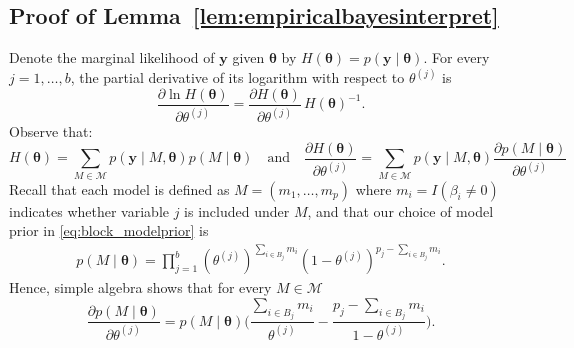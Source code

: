\documentclass[bj,authoryear]{imsart}
\theoremstyle{plain}
\newcommand{\M}{\mathcal{M}}
\newcommand{\bs}{\boldsymbol}
\begin{document}
\subsection{Proof of Lemma~\ref{lem:empiricalbayesinterpret}}

Denote the marginal likelihood of $\bs y$ given $\bs \theta$ by $H(\bs \theta)=p(\bs y \mid \bs \theta)$. For every $j=1,\ldots,b$, the partial derivative of its logarithm with respect to $\theta^{(j)}$ is
    \begin{equation}\label{eq:logderivative}
        \frac{\partial \ln H(\bs \theta)}{\partial \theta^{(j)}}=\frac{\partial H(\bs \theta)}{\partial \theta^{(j)}}\,H(\boldsymbol{\theta})^{-1}.
    \end{equation}
    Observe that:
    \begin{equation}\label{eq:partialmarglikelihood}
    H(\bs \theta)=\sum_{M \in \M}p(\bs y \mid M,\bs\theta)p(M \mid \bs \theta)
    \quad \text{and}\quad 
    \frac{\partial H(\bs \theta)}{\partial \theta^{(j)}}=\sum_{M\in \M}p(\bs y \mid M,\bs\theta)\frac{\partial p(M \mid \bs \theta)}{\partial \theta^{(j)}}
    \end{equation}
    Recall that each model is defined as $M=(m_1,\ldots,m_p)$ where $m_i = I(\beta_i \neq 0)$ indicates whether variable $j$ is included under $M$, and that our choice of model prior in \eqref{eq:block_modelprior} is 
    \begin{align}
        p( M \mid \boldsymbol{\theta})=
        \prod_{j=1}^b (\theta^{(j)})^{\sum_{i \in B_j} m_i}
        (1 - \theta^{(j)})^{p_j - \sum_{i \in B_j} m_i}.
        \nonumber
    \end{align}
    Hence, simple algebra shows that for every $M\in \mathcal M$
    \begin{equation}\label{eq:partialprobmodel}
    \frac{\partial p(M \mid \bs \theta)}{\partial \theta^{(j)}}= p(M \mid \bs \theta) \bigg(\frac{\sum_{i\in B_j}m_i}{\theta^{(j)}}-\frac{p_j-\sum_{i\in B_j}m_i}{1-\theta^{(j)}} \bigg).       
    \end{equation}
    
\end{document}
